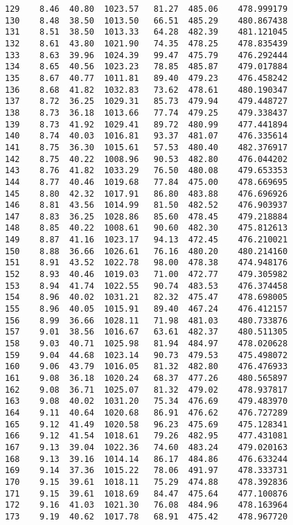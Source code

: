 \documentclass[11pt]{article}
\begin{document}
\begin{tcolorbox}[breakable, size=fbox, boxrule=.5pt, pad at break*=1mm, opacityfill=0]
\begin{Verbatim}[commandchars=\\\{\}]
129    8.46  40.80  1023.57   81.27  485.06    478.999179
130    8.48  38.50  1013.50   66.51  485.29    480.867438
131    8.51  38.50  1013.33   64.28  482.39    481.121045
132    8.61  43.80  1021.90   74.35  478.25    478.835439
133    8.63  39.96  1024.39   99.47  475.79    476.292444
134    8.65  40.56  1023.23   78.85  485.87    479.017884
135    8.67  40.77  1011.81   89.40  479.23    476.458242
136    8.68  41.82  1032.83   73.62  478.61    480.190347
137    8.72  36.25  1029.31   85.73  479.94    479.448727
138    8.73  36.18  1013.66   77.74  479.25    479.338437
139    8.73  41.92  1029.41   89.72  480.99    477.441894
140    8.74  40.03  1016.81   93.37  481.07    476.335614
141    8.75  36.30  1015.61   57.53  480.40    482.376917
142    8.75  40.22  1008.96   90.53  482.80    476.044202
143    8.76  41.82  1033.29   76.50  480.08    479.653353
144    8.77  40.46  1019.68   77.84  475.00    478.669695
145    8.80  42.32  1017.91   86.80  483.88    476.696926
146    8.81  43.56  1014.99   81.50  482.52    476.903937
147    8.83  36.25  1028.86   85.60  478.45    479.218884
148    8.85  40.22  1008.61   90.60  482.30    475.812613
149    8.87  41.16  1023.17   94.13  472.45    476.210021
150    8.88  36.66  1026.61   76.16  480.20    480.214160
151    8.91  43.52  1022.78   98.00  478.38    474.948176
152    8.93  40.46  1019.03   71.00  472.77    479.305982
153    8.94  41.74  1022.55   90.74  483.53    476.374458
154    8.96  40.02  1031.21   82.32  475.47    478.698005
155    8.96  40.05  1015.91   89.40  467.24    476.412157
156    8.99  36.66  1028.11   71.98  481.03    480.733876
157    9.01  38.56  1016.67   63.61  482.37    480.511305
158    9.03  40.71  1025.98   81.94  484.97    478.020628
159    9.04  44.68  1023.14   90.73  479.53    475.498072
160    9.06  43.79  1016.05   81.32  482.80    476.476933
161    9.08  36.18  1020.24   68.37  477.26    480.565897
162    9.08  36.71  1025.07   81.32  479.02    478.937817
163    9.08  40.02  1031.20   75.34  476.69    479.483970
164    9.11  40.64  1020.68   86.91  476.62    476.727289
165    9.12  41.49  1020.58   96.23  475.69    475.128341
166    9.12  41.54  1018.61   79.26  482.95    477.431081
167    9.13  39.04  1022.36   74.60  483.24    479.020163
168    9.13  39.16  1014.14   86.17  484.86    476.633244
169    9.14  37.36  1015.22   78.06  491.97    478.333731
170    9.15  39.61  1018.11   75.29  474.88    478.392836
171    9.15  39.61  1018.69   84.47  475.64    477.100876
172    9.16  41.03  1021.30   76.08  484.96    478.163964
173    9.19  40.62  1017.78   68.91  475.42    478.967720

\end{Verbatim}
\end{tcolorbox}
\end{document}
